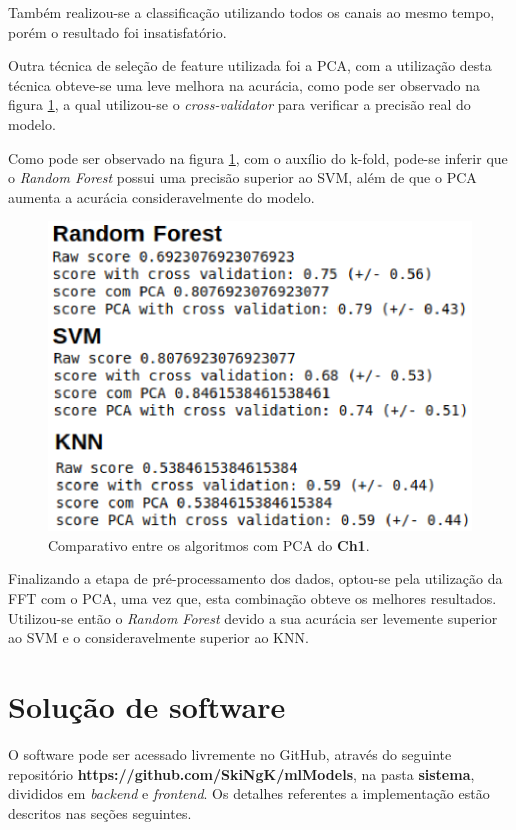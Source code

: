 Também realizou-se a classificação utilizando todos os canais ao mesmo tempo, porém o resultado foi insatisfatório.

Outra técnica de seleção de feature utilizada foi a PCA, com a utilização desta técnica obteve-se uma leve melhora na acurácia, como pode ser observado na figura \ref{pcavalidator}, a qual utilizou-se o \textit{cross-validator} para verificar a precisão real do modelo.

Como pode ser observado na figura \ref{pcavalidator}, com o auxílio do k-fold, pode-se inferir que o \textit{Random Forest} possui uma precisão superior ao SVM, além de que o PCA aumenta a acurácia consideravelmente do modelo.

\begin{figure}[!htb]
    \centering
    \includegraphics[width=1\textwidth]{figuras/modeloComp.eps}
    \caption{Comparativo entre os algoritmos com PCA do \textbf{Ch1}.}
    \label{pcavalidator}
\end{figure}


Finalizando a etapa de pré-processamento dos dados, optou-se pela utilização da FFT com o PCA, uma vez que, esta combinação obteve os melhores resultados. Utilizou-se então o \textit{Random Forest} devido a sua acurácia ser levemente superior ao SVM e o consideravelmente superior ao KNN.


\section{Solução de software}
O software pode ser acessado livremente no GitHub, através do seguinte repositório \textbf{https://github.com/SkiNgK/mlModels}, na pasta \textbf{sistema}, divididos em \textit{backend} e \textit{frontend}. Os detalhes referentes a implementação estão descritos nas seções seguintes.

